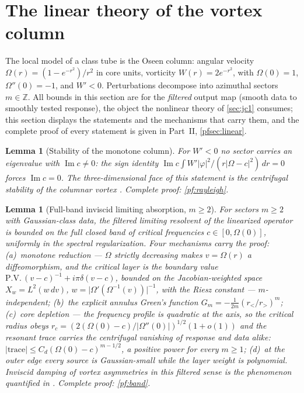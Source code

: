 \documentclass[11pt,letterpaper]{amsart}
\newtheorem{lemma}[theorem]{Lemma}
\theoremstyle{definition}
\theoremstyle{remark}
\newcommand{\abs}[1]{\lvert #1 \rvert}
\begin{document}
\section{The linear theory of the vortex column}\label{sec:linear}

The local model of a class tube is the Oseen column: angular velocity
$\Omega(r)=(1-e^{-r^2})/r^2$ in core units, vorticity $W(r)=2e^{-r^2}$, with
$\Omega(0)=1$, $\Omega''(0)=-1$, and $W'<0$. Perturbations decompose into azimuthal
sectors $m\in\mathbb{Z}$. All bounds in this section are for the \emph{filtered} output
map (smooth data to smoothly tested response), the object the nonlinear theory of
\cref{sec:jc1} consumes; this section displays the statements and the mechanisms that
carry them, and the complete proof of every statement is given in Part~II,
\cref{pfsec:linear}.

\begin{lemma}[Stability of the monotone column]\label{lem:rayleigh}
For $W'<0$ no sector carries an eigenvalue with $\operatorname{Im}c\neq0$: the sign
identity $\operatorname{Im}c\int W'\abs{\varphi}^2/(r\abs{\Omega-c}^2)\,dr=0$ forces
$\operatorname{Im}c=0$. The three-dimensional face of this statement is the
centrifugal stability of the columnar vortex \cite{GallaySmets2020}. Complete proof:
\cref{pf:rayleigh}.
\end{lemma}

\begin{lemma}[Full-band inviscid limiting absorption, $m\ge2$]\label{lem:band}
For sectors $m\ge2$ with Gaussian-class data, the filtered limiting resolvent of the
linearized operator is bounded on the full closed band of critical frequencies
$c\in[0,\Omega(0)]$, uniformly in the spectral regularization. Four mechanisms carry
the proof: \textup{(a)}~\emph{monotone reduction} --- $\Omega$ strictly decreasing
makes $v=\Omega(r)$ a diffeomorphism, and the critical layer is the boundary value
$\mathrm{P.V.}\,(v-c)^{-1}+i\pi\delta(v-c)$, bounded on the Jacobian-weighted space
$X_w=L^2(w\,dv)$, $w=\abs{\Omega'(\Omega^{-1}(v))}^{-1}$, with the Riesz constant ---
$m$-independent; \textup{(b)}~the explicit annulus Green's function
$G_m=-\tfrac{1}{2m}(r_</r_>)^m$; \textup{(c)}~\emph{core depletion} --- the frequency
profile is quadratic at the axis, so the critical radius obeys
$r_c=(2(\Omega(0)-c)/\abs{\Omega''(0)})^{1/2}(1+o(1))$ and the resonant trace carries
the centrifugal vanishing of response and data alike:
$\abs{\mathrm{trace}}\le C_d(\Omega(0)-c)^{m-1/2}$, a positive power for every
$m\ge1$; \textup{(d)}~at the outer edge every source is Gaussian-small while the layer
weight is polynomial. Inviscid damping of vortex asymmetries in this filtered sense is
the phenomenon quantified in \cite{BCZV2019,Schecter2000}. Complete proof:
\cref{pf:band}.
\end{lemma}
\end{document}
